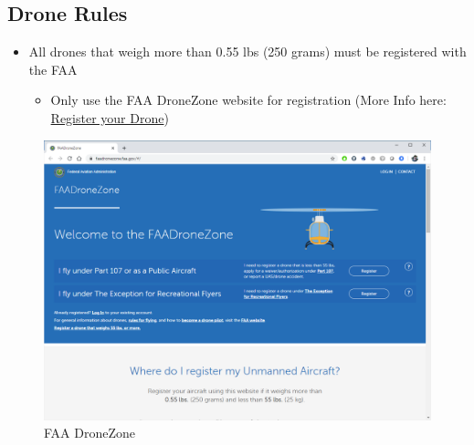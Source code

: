 \documentclass[
  12pt,
]{book}
\providecommand{\tightlist}{%
  \setlength{\itemsep}{0pt}\setlength{\parskip}{0pt}}
\begin{document}
\hypertarget{drone-rules}{%
\subsection{Drone Rules}\label{drone-rules}}

\begin{itemize}
\tightlist
\item
  All drones that weigh more than 0.55 lbs (250 grams) must be registered with the FAA

  \begin{itemize}
  \tightlist
  \item
    Only use the FAA DroneZone website for registration (More Info here: \protect\hyperlink{ch-registration}{Register your Drone})
  \end{itemize}
\end{itemize}

\begin{figure}

{\centering \includegraphics[width=0.8\linewidth]{images/reg_site} 

}

\caption{FAA DroneZone}\label{fig:reg-page2}
\end{figure}
\end{document}
